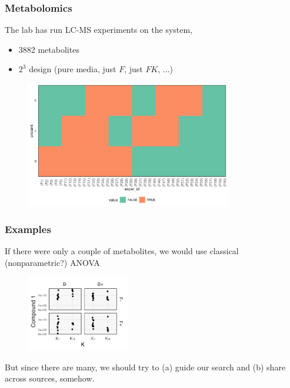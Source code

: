\documentclass[hyperref={colorlinks=true, linkcolor=violet, citecolor=SeaGreen}]{beamer}
\begin{document}
\begin{frame}
  \frametitle{Metabolomics}
  The lab has run LC-MS experiments on the system,
  \begin{itemize}
    \item 3882 metabolites
    \item $2^3$ design (pure media, just $F$, just $FK$, ...)
  \end{itemize}

  \begin{figure}
    \includegraphics[width=0.8\textwidth]{configurations}
  \end{figure}
\end{frame}

\begin{frame}
  \frametitle{Examples}
    If there were only a couple of metabolites, we would use classical
    (nonparametric?) ANOVA

  \begin{figure}
    \includegraphics[width=0.4\textwidth]{compound-1}
  \end{figure}

    But since there are many, we should try to (a) guide our search and (b)
    share across sources, somehow.
\end{frame}
\end{document}

